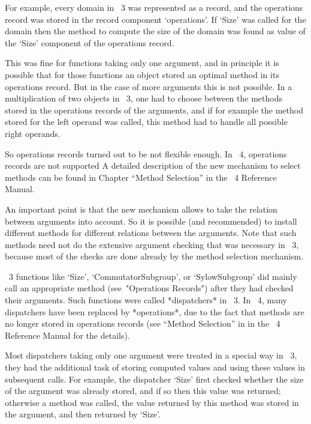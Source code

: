 For example, every domain in {\GAP}~3 was represented as a record, and
the operations record was stored in the record component `operations'.
If `Size' was called for the domain then the method to compute the
size of the domain was found as value of the `Size' component of the
operations record.

This was fine for functions taking only one argument, and in principle
it is possible that for those functions an object stored an optimal
method in its operations record.  But in the case of more arguments
this is not possible.  In a multiplication of two objects in {\GAP}~3,
one had to choose between the methods stored in the operations records
of the arguments, and if for example the method stored for the left
operand was called, this method had to handle all possible right
operands.

So operations records turned out to be not flexible enough.  In
{\GAP}~4, operations records are not supported 
A detailed description
of the new mechanism to select methods can be found in
Chapter ``Method Selection'' in the {\GAP}~4 Reference Manual.

An important point is that the new mechanism allows {\GAP} to take the
relation between arguments into account.  So it is possible (and
recommended) to install different methods for different relations
between the arguments.  Note that such methods need not do the
extensive argument checking that was necessary in {\GAP}~3, because
most of the checks are done already by the method selection mechanism.



{\GAP}~3 functions like `Size', `CommutatorSubgroup', or
`SylowSubgroup' did mainly call an appropriate method (see~"Operations
Records") after they had checked their arguments.  Such functions were
called *dispatchers* in {\GAP}~3.  In {\GAP}~4, many dispatchers have
been replaced by *operations*, due to the fact that methods are no
longer stored in operations records (see ``Method Selection'' in
in the {\GAP}~4 Reference Manual for the details).

Most dispatchers taking only one argument were treated in a special
way in {\GAP}~3, they had the additional task of storing computed
values and using these values in subsequent calls.  For example, the
dispatcher `Size' first checked whether the size of the argument was
already stored, and if so then this value was returned; otherwise a
method was called, the value returned by this method was stored in the
argument, and then returned by `Size'.

